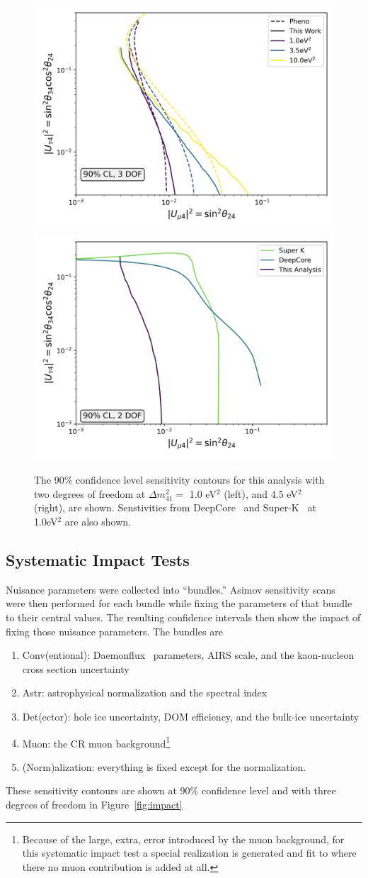 \documentclass[main.tex]{subfiles}
\begin{document}
\begin{figure}
    \centering
    \includegraphics[width=0.45\linewidth]{figures/pheno_joint_asimov_oldairs_Realization_Asimov_sterile_0_cl0.9_dof3.png}%
    \includegraphics[width=0.45\linewidth]{figures/comparison.png}
    \caption{The 90\% confidence level sensitivity contours for this analysis with two degrees of freedom at $\Delta m_{41}^{2}=$ 1.0 eV$^{2}$ (left), and  4.5 eV$^{2}$ (right), are shown. Senstivities from DeepCore~\cite{Aartsen_2017_dc} and Super-K~\cite{PhysRevD.91.052019} at 1.0eV$^{2}$ are also shown.}\label{fig:asimov_compare}
\end{figure}


\subsection{Systematic Impact Tests}

Nuisance parameters were collected into ``bundles.'' 
Asimov sensitivity scans~\cite{Cowan_2011} were then performed for each bundle while fixing the parameters of that bundle to their central values.
The resulting confidence intervals then show the impact of fixing those nuisance parameters. 
The bundles are 
\begin{enumerate}
    \item Conv(entional): Daemonflux~\cite{yanez2023daemonflux} parameters, AIRS scale, and the kaon-nucleon cross section uncertainty
    \item Astr: astrophysical normalization and the spectral index
    \item Det(ector): hole ice uncertainty, DOM efficiency, and the bulk-ice uncertainty
    \item Muon: the CR muon background\footnote{Because of the large, extra, error introduced by the muon background, for this systematic impact test a special realization is generated and fit to where there no muon contribution is added at all.}
    \item (Norm)alization: everything is fixed except for the normalization.
\end{enumerate}
These sensitivity contours are shown at 90\% confidence level and with three degrees of freedom in Figure~\ref{fig:impact}
\end{document}
